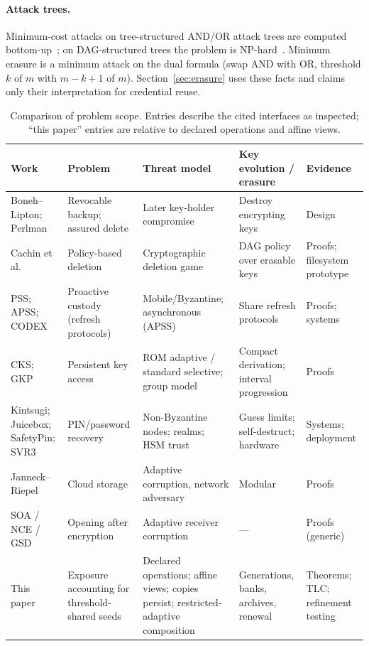 \documentclass[pdflatex,sn-mathphys-num]{sn-jnl}
\theoremstyle{plain}
\theoremstyle{definition}
\begin{document}
\paragraph{Attack trees.}
Minimum-cost attacks on tree-structured AND/OR attack trees are computed bottom-up~\cite{mauw2005}; on DAG-structured trees the problem is NP-hard~\cite{lopuhaa2022}. Minimum erasure is a minimum attack on the dual formula (swap AND with OR, threshold $k$ of $m$ with $m-k+1$ of $m$). Section~\ref{sec:erasure} uses these facts and claims only their interpretation for credential reuse.

\begin{table}[htbp]
\caption{Comparison of problem scope. Entries describe the cited interfaces as inspected; ``this paper'' entries are relative to declared operations and affine views.}\label{tab:comparison}
\centering\footnotesize
\begin{tabularx}{\linewidth}{@{}p{.15\linewidth}YYYY@{}}\toprule
Work & Problem & Threat model & Key evolution / erasure & Evidence\\\midrule
Boneh--Lipton; Perlman & Revocable backup; assured delete & Later key-holder compromise & Destroy encrypting keys & Design\\
Cachin et al. & Policy-based deletion & Cryptographic deletion game & DAG policy over erasable keys & Proofs; filesystem prototype\\
PSS; APSS; CODEX & Proactive custody (refresh protocols) & Mobile/Byzantine; asynchronous (APSS) & Share refresh protocols & Proofs; systems\\
CKS; GKP & Persistent key access & ROM adaptive / standard selective; group model & Compact derivation; interval progression & Proofs\\
Kintsugi; Juicebox; SafetyPin; SVR3 & PIN/password recovery & Non-Byzantine nodes; realms; HSM trust & Guess limits; self-destruct; hardware & Systems; deployment\\
Janneck--Riepel & Cloud storage & Adaptive corruption, network adversary & Modular & Proofs\\
SOA / NCE / GSD & Opening after encryption & Adaptive receiver corruption & --- & Proofs (generic)\\
This paper & Exposure accounting for threshold-shared seeds & Declared operations; affine views; copies persist; restricted-adaptive composition & Generations, banks, archives, renewal & Theorems; TLC; refinement testing\\\bottomrule
\end{tabularx}
\end{table}
\end{document}
